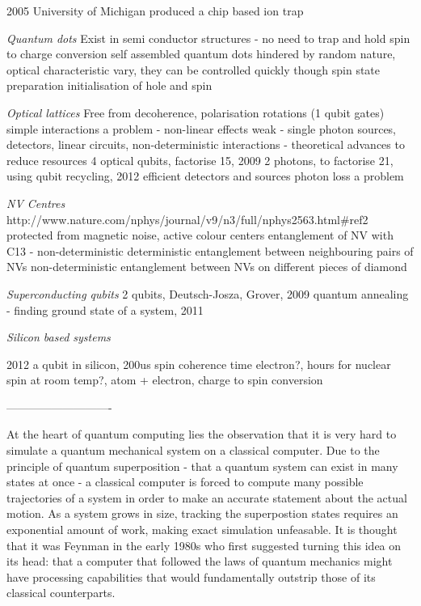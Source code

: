 2005 University of Michigan produced a chip based ion trap \cite{?}


\textit{Quantum dots}
Exist in semi conductor structures - no need to trap and hold
spin to charge conversion
\cite{quantum_dot_review_07}
self assembled quantum dots hindered by random nature, optical characteristic vary, they can be controlled quickly though
\cite{atature_quantum_dot_06} spin state preparation
\cite{gerardot_dot_08} initialisation of hole and spin
\cite{quantum_dot_control_08}
\cite{quantum_dot_measurement_06}

\textit{Optical lattices}
Free from decoherence, polarisation rotations (1 qubit gates) simple
interactions a problem - non-linear effects weak
\cite{klm} - single photon sources, detectors, linear circuits, non-deterministic interactions
\cite{science_loqc_review} - theoretical advances to reduce resources
\cite{shor_chip_bristol} 4 optical qubits, factorise 15, 2009
\cite{shor_chip_bristol_2} 2 photons, to factorise 21, using qubit recycling, 2012
efficient detectors \cite{single_photon_detector_review_09} and sources \cite{single_photon_source_review_04}
photon loss a problem

\textit{NV Centres}
http://www.nature.com/nphys/journal/v9/n3/full/nphys2563.html#ref2
protected from magnetic noise, active colour centers
\cite{two_qubit_nv}
\cite{nv_entanglement_hanson} entanglement of NV with C13 - non-deterministic
\cite{nv_entanglement_dolde} deterministic entanglement between neighbouring pairs of NVs
\cite{remote_nv_entanglement_hanson} non-deterministic entanglement between NVs on different pieces of diamond

\textit{Superconducting qubits}
\cite{two_qubit_chip_yale} 2 qubits, Deutsch-Josza, Grover, 2009
\cite{dwave_annealing} quantum annealing - finding ground state of a system, 2011

\textit{Silicon based systems}

\cite{silicon_proposal_98}
\cite{silicon_qubit} 2012 a qubit in silicon, 200us spin coherence time electron?, hours for nuclear spin at room temp?, atom + electron, charge to spin conversion
\cite{silicon_seconds}


----------------------------

At the heart of quantum computing lies the observation that it is very hard to simulate a quantum mechanical system on a classical computer. Due to the principle of quantum superposition - that a quantum system can exist in many states at once - a classical computer is forced to compute many possible trajectories of a system in order to make an accurate statement about the actual motion. As a system grows in size, tracking the superpostion states requires an exponential amount of work, making exact simulation unfeasable. It is thought that it was Feynman in the early 1980s \cite{feynman82} who first suggested turning this idea on its head: that a computer that followed the laws of quantum mechanics might have processing capabilities that would fundamentally outstrip those of its classical counterparts. 

